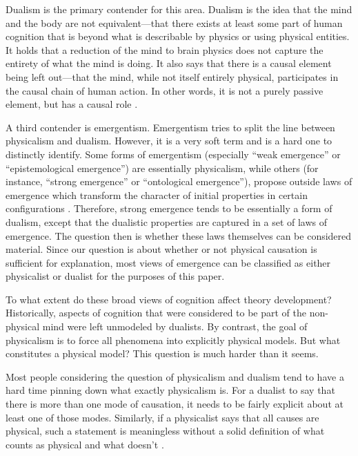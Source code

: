Dualism is the primary contender for this area.  Dualism is the idea that the mind and the body are not equivalent---that there exists at least some part of human cognition that is beyond what is describable by physics or using physical entities.  It holds that a reduction of the mind to brain physics does not capture the entirety of what the mind is doing.  It also says that there is a causal element being left out---that the mind, while not itself entirely physical, participates in the causal chain of human action.  In other words, it is not a purely passive element, but has a causal role \citep{heart1994}.

A third contender is emergentism.  Emergentism tries to split the line between physicalism and dualism.  However, it is a very soft term and is a hard one to distinctly identify.  Some forms of emergentism (especially ``weak emergence'' or ``epistemological emergence'') are essentially physicalism, while others (for instance, ``strong emergence'' or ``ontological emergence''), propose outside laws of emergence which transform the character of initial properties in certain configurations \citep{oconnorwong2012}.  Therefore, strong emergence tends to be essentially a form of dualism, except that the dualistic properties are captured in a set of laws of emergence.  The question then is whether these laws themselves can be considered material.  Since our question is about whether or not physical causation is sufficient for explanation, most views of emergence can be classified as either physicalist or dualist for the purposes of this paper.

To what extent do these broad views of cognition affect theory development?  Historically, aspects of cognition that were considered to be part of the non-physical mind were left unmodeled by dualists.  By contrast, the goal of physicalism is to force all phenomena into explicitly physical models.  But what constitutes a physical model?  This question is much harder than it seems.

Most people considering the question of physicalism and dualism tend to have a hard time pinning down what exactly physicalism is.  For a dualist to say that there is more than one mode of causation, it needs to be fairly explicit about at least one of those modes.  Similarly, if a physicalist says that all causes are physical, such a statement is meaningless without a solid definition of what counts as physical and what doesn't \citep{stoljar2009}.

